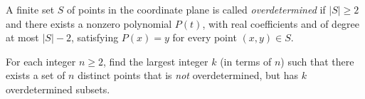 A finite set $S$ of points in the coordinate plane is called \textit{overdetermined} if $|S|\ge 2$ and there exists a nonzero polynomial $P(t)$, with real coefficients and of degree at most $|S|-2$, satisfying $P(x)=y$ for every point $(x,y)\in S$.

For each integer $n\ge 2$, find the largest integer $k$ (in terms of $n$) such that there exists a set of $n$ distinct points that is \textit{not} overdetermined, but has $k$ overdetermined subsets.

